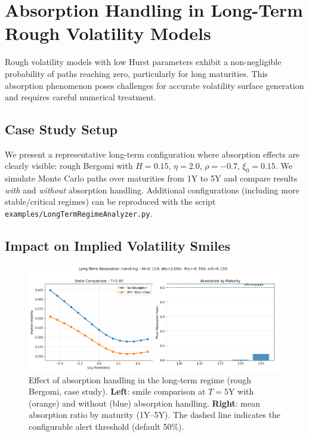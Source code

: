 	\section{Absorption Handling in Long-Term Rough Volatility Models}
	\label{sec:absorption-analysis}
	
	Rough volatility models with low Hurst parameters exhibit a non-negligible probability of paths reaching zero, particularly for long maturities. This absorption phenomenon poses challenges for accurate volatility surface generation and requires careful numerical treatment.
	
	\subsection{Case Study Setup}
	
	We present a representative long-term configuration where absorption effects are clearly visible:
	rough Bergomi with $H = 0.15$, $\eta = 2.0$, $\rho = -0.7$, $\xi_0 = 0.15$.
	We simulate Monte Carlo paths over maturities from 1Y to 5Y and compare results \emph{with}
	and \emph{without} absorption handling. Additional configurations (including more stable/critical
	regimes) can be reproduced with the script \texttt{examples/LongTermRegimeAnalyzer.py}.
	
	\subsection{Impact on Implied Volatility Smiles}
	
	\begin{figure}[ht]
		\centering
		\includegraphics[width=\textwidth]{../images/long_term_analysis_comparison.png}
		\caption{Effect of absorption handling in the long-term regime (rough Bergomi, case study).
			\textbf{Left}: smile comparison at $T=5$Y with (orange) and without (blue) absorption handling.
			\textbf{Right}: mean absorption ratio by maturity (1Y–5Y). The dashed line indicates the configurable alert threshold (default 50\%).}
		\label{fig:absorption-comparison}
	\end{figure}
	
